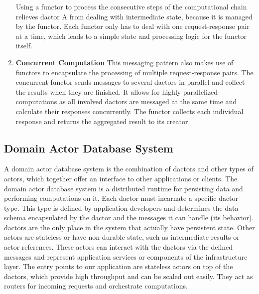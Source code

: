 \begin{enumerate}
        Using a \gls{functor} to process the consecutive steps of the computational chain relieves \gls{dactor} A from dealing with intermediate state, because it is managed by the \gls{functor}.
        Each \gls{functor} only has to deal with one request-response pair at a time, which leads to a simple state and processing logic for the \gls{functor} itself.

      \item\label{enum:comp_pattern_3} \textbf{Concurrent Computation}
        This messaging pattern also makes use of \glspl{functor} to encapsulate the processing of multiple request-response pairs.
        The concurrent \gls{functor} sends messages to several \glspl{dactor} in parallel and collect the results when they are finished.
        It allows for highly parallelized computations as all involved \glspl{dactor} are messaged at the same time and calculate their responses concurrently.
        The \gls{functor} collects each individual response and returns the aggregated result to its creator.
    \end{enumerate}


  \subsection{Domain Actor Database System}\label{sec:domain_actor_database}
    A domain actor database system is the combination of \glspl{dactor} and other types of actors, which together offer an interface to other applications or clients.
    The domain actor database system is a distributed runtime for persisting data and performing computations on it.
    Each \gls{dactor} must incarnate a specific \gls{dactor} type.
    This type is defined by application developers and determines the data schema encapsulated by the \gls{dactor} and the messages it can handle (its behavior).
    \Glspl{dactor} are the only place in the system that actually have persistent state.
    Other actors are stateless or have non-durable state, such as intermediate results or actor references.
    These actors can interact with the \glspl{dactor} via the defined messages and represent application services or components of the infrastructure layer.
    The entry points to our application are stateless actors on top of the \glspl{dactor}, which provide high throughput and can be scaled out easily.
    They act as routers for incoming requests and orchestrate computations.
